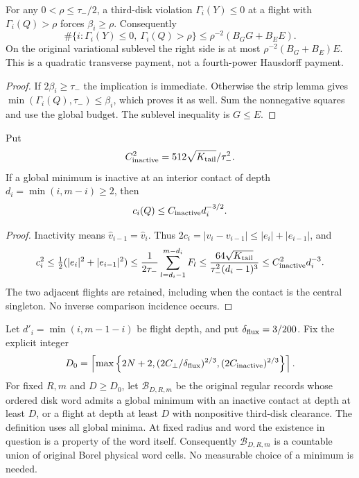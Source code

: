 \begin{corollary}
\label{cor:tb-source-inclusion}
For any $0<\rho\le\tau_-/2$, a third-disk violation
$\Gamma_i(Y)\le0$ at a flight with $\Gamma_i(Q)>\rho$
forces $\beta_i\ge\rho$.  Consequently
\begin{equation}\label{eq:tb-obstruction-count}
 \#\{i:\Gamma_i(Y)\le0,\ \Gamma_i(Q)>\rho\}
       \le\rho^{-2}(B_GG+B_EE).
\end{equation}
On the original variational sublevel the right side is at most
$\rho^{-2}(B_G+B_E)E$.  This is a quadratic transverse payment,
not a fourth-power Hausdorff payment.
\end{corollary}
\begin{proof}
If $2\beta_i\ge\tau_-$ the implication is immediate.  Otherwise
the strip lemma gives $\min(\Gamma_i(Q),\tau_-)\le\beta_i$,
which proves it as well.  Sum the nonnegative squares and use the
global budget.  The sublevel inequality is $G\le E$.
\end{proof}

\begin{lemma}
\label{lem:tb-inactive}
Put
\begin{equation}\label{eq:tb-inactive-constant}
 C_{\rm inactive}^2=512\sqrt{K_{\rm tail}}/\tau_-^2.
\end{equation}
If a global minimum is inactive at an interior contact of depth
$d_i=\min(i,m-i)\ge2$, then
\begin{equation}\label{eq:tb-inactive-witness}
 c_i(Q)\le C_{\rm inactive}d_i^{-3/2}.
\end{equation}
\end{lemma}
\begin{proof}
Inactivity means $\widehat v_{i-1}=\widehat v_i$.  Thus
$2c_i=|v_i-v_{i-1}|\le|e_i|+|e_{i-1}|$, and
\[
 c_i^2\le\tfrac12(|e_i|^2+|e_{i-1}|^2)
 \le\frac1{2\tau_-}\sum_{l=d_i-1}^{m-d_i}F_l
 \le\frac{64\sqrt{K_{\rm tail}}}{\tau_-^2(d_i-1)^3}
 \le C_{\rm inactive}^2d_i^{-3}.
\]
The two adjacent flights are retained, including when the contact
is the central singleton.  No inverse comparison incidence occurs.
\end{proof}

Let $d'_i=\min(i,m-1-i)$ be flight depth, and put
$\delta_{\rm flux}=3/200$.  Fix the explicit integer
\begin{equation}\label{eq:tb-D0}
 D_0=\left\lceil\max\left\{2N+2,
 (2C_\perp/\delta_{\rm flux})^{2/3},
 (2C_{\rm inactive})^{2/3}\right\}\right\rceil.
\end{equation}
For fixed $R,m$ and $D\ge D_0$, let $\mathcal B_{D,R,m}$ be
the original regular records whose ordered disk word admits a global
minimum with an inactive contact at depth at least $D$, or a flight
at depth at least $D$ with nonpositive third-disk clearance.
The definition uses all global minima.  At fixed radius and word
the existence in question is a property of the word itself.
Consequently $\mathcal B_{D,R,m}$ is a countable union of original
Borel physical word cells.  No measurable choice of a minimum is
needed.

